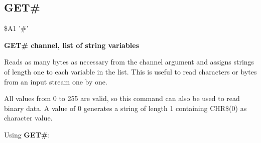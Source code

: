 \subsection{GET\#}
\begin{description}[leftmargin=3cm,style=nextline]
\item [Token:] \$A1 '\#'
\item [Format:] {\bf GET\# channel, list of string variables}
\item [Usage:] Reads as many bytes
               as necessary from the channel argument
               and assigns strings of length one to
               each variable in the list.
               This is useful to read characters or bytes from
               an input stream one by one.

\item [Remarks:] All values from 0 to 255 are valid, so this
               command can also be used to read binary data.
               A value of 0 generates a string of length 1
               containing CHR\$(0) as character value.

\item [Example:] Using {\bf GET\#}:
\end{description}


\newpage
